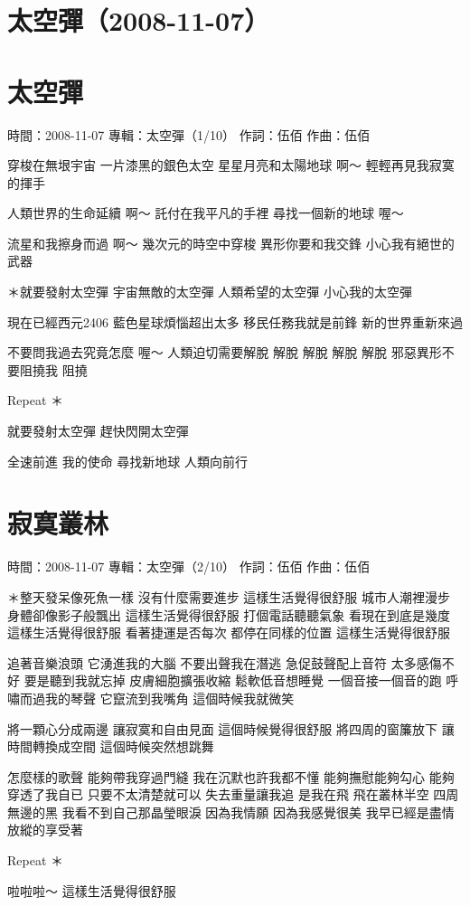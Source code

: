 \documentclass[UTF8,a4paper,oneside,twocolumn,12pt]{ctexbook}
\newcommand{\infopair}[2]{\textbullet #1：#2}
\newcommand{\zc}[1][伍佰]{\infopair{作詞}{#1}}
\newcommand{\zq}[1][伍佰]{\infopair{作曲}{#1}}
\newcommand{\zj}[1]{\infopair{專輯}{#1}}
\newcommand{\sj}[1]{\infopair{時間}{#1}}
\newenvironment{info}{\begin{flushleft}\kaishu
	}
	{\end{flushleft}\normalsize\yahei\par}
\newenvironment{lyric}{
	}
{}
\begin{document}
\section*{太空彈（2008-11-07）}
\section{太空彈}
\begin{info}
	\sj{2008-11-07}
	\zj{太空彈（1/10）}
	\zc
	\zq
\end{info}
\begin{lyric}
	穿梭在無垠宇宙
	一片漆黑的銀色太空
	星星月亮和太陽地球
	啊～ 輕輕再見我寂寞的揮手

	人類世界的生命延續
	啊～ 託付在我平凡的手裡
	尋找一個新的地球
	喔～

	流星和我擦身而過
	啊～ 幾次元的時空中穿梭
	異形你要和我交鋒
	小心我有絕世的武器

	＊就要發射太空彈
	宇宙無敵的太空彈
	人類希望的太空彈
	小心我的太空彈

	現在已經西元2406
	藍色星球煩惱超出太多
	移民任務我就是前鋒
	新的世界重新來過

	不要問我過去究竟怎麼
	喔～ 人類迫切需要解脫
	解脫 解脫 解脫 解脫
	邪惡異形不要阻撓我
	阻撓

	Repeat ＊

	就要發射太空彈
	趕快閃開太空彈

	全速前進 我的使命
	尋找新地球 人類向前行
\end{lyric}

\section{寂寞叢林}
\begin{info}
	\sj{2008-11-07}
	\zj{太空彈（2/10）}
	\zc
	\zq
\end{info}
\begin{lyric}
	＊整天發呆像死魚一樣 沒有什麼需要進步 這樣生活覺得很舒服
	城市人潮裡漫步 身體卻像影子般飄出 這樣生活覺得很舒服
	打個電話聽聽氣象 看現在到底是幾度 這樣生活覺得很舒服
	看著捷運是否每次 都停在同樣的位置 這樣生活覺得很舒服

	追著音樂浪頭 它湧進我的大腦 不要出聲我在潛逃
	急促鼓聲配上音符 太多感傷不好 要是聽到我就忘掉
	皮膚細胞擴張收縮 鬆軟低音想睡覺 一個音接一個音的跑
	呼嘯而過我的琴聲 它竄流到我嘴角 這個時候我就微笑

	將一顆心分成兩邊 讓寂寞和自由見面 這個時候覺得很舒服
	將四周的窗簾放下 讓時間轉換成空間 這個時候突然想跳舞

	怎麼樣的歌聲 能夠帶我穿過門縫 我在沉默也許我都不懂
	能夠撫慰能夠勾心 能夠穿透了我自已 只要不太清楚就可以
	失去重量讓我追 是我在飛
	飛在叢林半空 四周無邊的黑 我看不到自己那晶瑩眼淚
	因為我情願 因為我感覺很美 我早已經是盡情放縱的享受著

	Repeat ＊

	啦啦啦～ 這樣生活覺得很舒服
\end{lyric}
\end{document}
